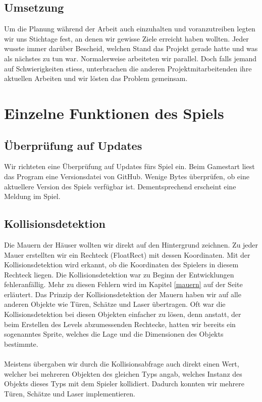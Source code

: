 \documentclass[11pt,a4paper]{scrbook}
\begin{document}
\subsection{Umsetzung}
Um die Planung während der Arbeit auch einzuhalten und voranzutreiben legten wir uns Stichtage fest, an denen wir gewisse Ziele erreicht haben wollten. Jeder wusste immer darüber Bescheid, welchen Stand das Projekt gerade hatte und was als nächstes zu tun war. Normalerweise arbeiteten wir parallel. Doch falls jemand auf Schwierigkeiten stiess, unterbrachen die anderen Projektmitarbeitenden ihre aktuellen Arbeiten und wir lösten das Problem gemeinsam.  
\newpage
\section{Einzelne Funktionen des Spiels}

\subsection{Überprüfung auf Updates}
Wir richteten eine Überprüfung auf Updates fürs Spiel ein. Beim Gamestart liest das Program eine Versionsdatei von GitHub. Wenige Bytes überprüfen, ob eine aktuellere Version des Spiels verfügbar ist. Dementsprechend erscheint eine Meldung im Spiel.

\subsection{Kollisionsdetektion}
Die Mauern der Häuser wollten wir direkt auf den Hintergrund zeichnen. Zu jeder Mauer erstellten wir ein Rechteck (FloatRect) mit dessen Koordinaten. Mit der Kollisionsdetektion wird erkannt, ob die Koordinaten des Spielers in diesem Rechteck liegen.
Die Kollisionsdetektion war zu Beginn der Entwicklungen fehleranfällig.
Mehr zu diesen Fehlern wird im Kapitel \ref{mauern} auf der Seite \pageref{mauern} erläutert.
Das Prinzip der Kollisionsdetektion der Mauern haben wir auf alle anderen Objekte wie Türen, Schätze und Laser übertragen.
Oft war die Kollisionsdetektion bei diesen Objekten einfacher zu lösen, denn anstatt, der beim Erstellen des Levels abzumessenden Rechtecke, hatten wir bereits ein sogenanntes Sprite, welches die Lage und die Dimensionen des Objekts bestimmte.\\
\\
Meistens übergaben wir durch die Kollisionsabfrage auch direkt einen Wert, welcher bei mehreren Objekten des gleichen Typs angab, welches Instanz des Objekts dieses Typs mit dem Spieler kollidiert.
Dadurch konnten wir mehrere Türen, Schätze und Laser implementieren.
\end{document}
